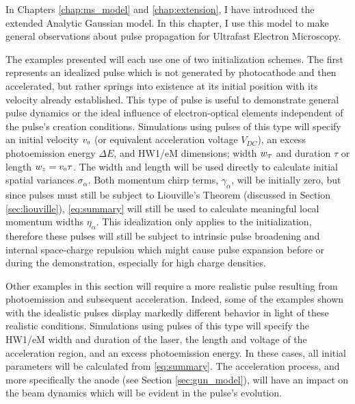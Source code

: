 
In Chapters \ref{chap:ms_model} and \ref{chap:extension}, I have introduced the extended Analytic Gaussian model.
In this chapter, I use this model to make general observations about pulse propagation for Ultrafast Electron Microscopy.

The examples presented will each use one of two initialization schemes.
The first represents an idealized pulse which is not generated by photocathode and then accelerated, but rather springs into existence at its initial position with its velocity already established.
This type of pulse is useful to demonstrate general pulse dynamics or the ideal influence of electron-optical elements independent of the pulse's creation conditions.
Simulations using pulses of this type will specify an initial velocity $v_{{\scriptscriptstyle 0}}$ (or equivalent acceleration voltage $V_{DC}$), an excess photoemission energy $\Delta E$, and HW1/eM dimensions; width $w_{{\scriptscriptstyle T}}$ and duration $\tau$ or length $ w_z = v_{{\scriptscriptstyle 0}} \tau$.
The width and length will be used directly to calculate initial spatial variances $\sigma_{\alpha}$.
Both momentum chirp terms, $\gamma_{\alpha}$, will be initially zero, but since pulses must still be subject to Liouville's Theorem (discussed in Section \ref{sec:liouville}), \ref{eq:summary} will still be used to calculate meaningful local momentum widths $\eta_{\alpha}$.
This idealization only applies to the initialization, therefore these pulses will still be subject to intrinsic pulse broadening and internal space-charge repulsion which might cause pulse expansion before or during the demonstration, especially for high charge densities.

Other examples in this section will require a more realistic pulse resulting from photoemission and subsequent acceleration.
Indeed, some of the examples shown with the idealistic pulses display markedly different behavior in light of these realistic conditions.
Simulations using pulses of this type will specify the HW1/eM width and duration of the laser, the length and voltage of the acceleration region, and an excess photoemission energy.
In these cases, all initial parameters will be calculated from \ref{eq:summary}.
The acceleration process, and more specifically the anode (see Section \ref{sec:gun_model}), will have an impact on the beam dynamics which will be evident in the pulse's evolution.

